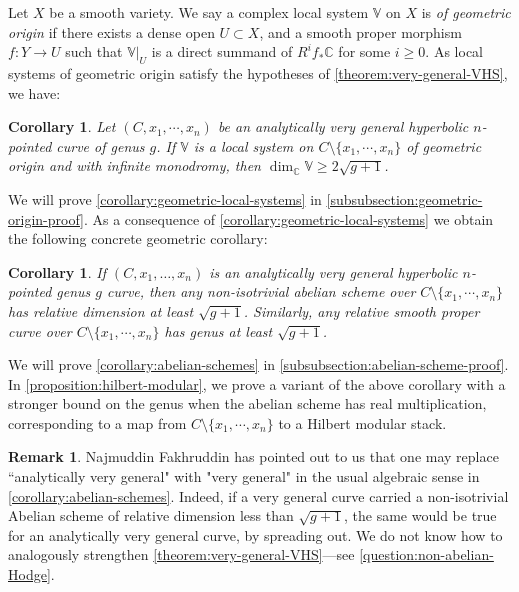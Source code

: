 \documentclass[12 pt]{amsart}
\theoremstyle{plain}
\newtheorem{corollary}[subsubsection]{Corollary}
\theoremstyle{definition}
\newtheorem{remark}[subsubsection]{Remark}
\theoremstyle{remark}
\numberwithin{equation}{section}
\begin{document}
Let $X$ be a smooth variety. We say a complex local system $\mathbb{V}$ on $X$ is \emph{of geometric origin} if there exists a dense open $U\subset X$, and a smooth proper morphism $f: Y\to U$ such that $\mathbb{V}|_U$ is a direct summand of $R^if_*\mathbb{C}$ for some $i\geq 0$. As local systems of geometric origin satisfy the hypotheses of \autoref{theorem:very-general-VHS}, we have:
\begin{corollary}\label{corollary:geometric-local-systems}
Let $(C, x_1, \cdots, x_n)$ be an analytically very general hyperbolic $n$-pointed curve of genus $g$. If $\mathbb{V}$ is a local system on $C\setminus\{x_1, \cdots, x_n\}$ of geometric origin and with infinite monodromy, then $\dim_{\mathbb{C}}\mathbb{V}\geq 2\sqrt{g+1}$.
\end{corollary}
We will prove \autoref{corollary:geometric-local-systems} 
in \autoref{subsubsection:geometric-origin-proof}.
As a consequence of \autoref{corollary:geometric-local-systems} 
we obtain the following concrete geometric corollary:
\begin{corollary}
	\label{corollary:abelian-schemes}
	If $(C, x_1, \ldots, x_n)$ is an analytically
very general hyperbolic $n$-pointed genus $g$ curve, then any non-isotrivial
abelian scheme over $C\setminus\{x_1, \cdots, x_n\}$  has relative dimension at least $\sqrt{g+1}$.
	Similarly, any relative smooth proper curve over $C\setminus\{x_1, \cdots, x_n\}$
	has genus at least $\sqrt{g+1}$.
\end{corollary}
We will prove \autoref{corollary:abelian-schemes} 
in \autoref{subsubsection:abelian-scheme-proof}.
In \autoref{proposition:hilbert-modular},
we prove a variant of the above corollary
with a stronger bound on the genus
when the abelian scheme has real multiplication, corresponding to a map from 
$C\setminus\{x_1, \cdots, x_n\}$ to a Hilbert modular stack.

\begin{remark}
	\label{remark:remove-analytic}
	Najmuddin Fakhruddin has pointed out to us that one may replace ``analytically very general" with "very general" 
	in the usual algebraic sense in \autoref{corollary:abelian-schemes}. Indeed, if a very general curve carried a non-isotrivial Abelian scheme of relative dimension less than $\sqrt{g+1}$, the same would be true for an analytically very general curve, by spreading out. 
	We do not know how to analogously strengthen \autoref{theorem:very-general-VHS}---see  \autoref{question:non-abelian-Hodge}.
\end{remark}
\end{document}
